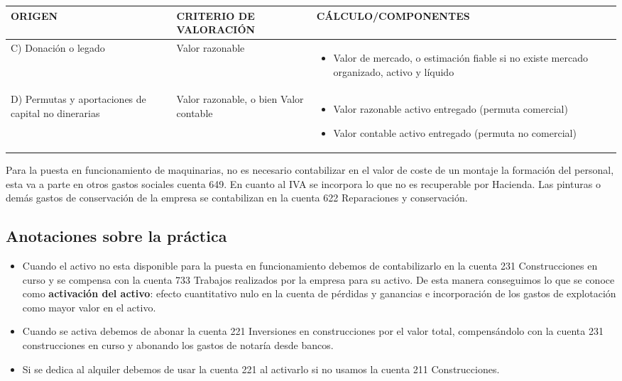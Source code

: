 \documentclass[a4paper,12pt]{article}
\begin{document}
\begin{table}[H]
\centering
\begin{tabular}{|p{4cm}|p{4cm}|p{6cm}|}
\hline
\textbf{ORIGEN} & \textbf{CRITERIO DE VALORACIÓN} & \textbf{CÁLCULO/COMPONENTES} \\
\hline
C) Donación o legado & Valor razonable & 
\begin{itemize}
    \item Valor de mercado, o estimación fiable si no existe mercado organizado, activo y líquido
\end{itemize} \\
\hline
D) Permutas y aportaciones de capital no dinerarias & Valor razonable, o bien Valor contable & 
\begin{itemize}
    \item Valor razonable activo entregado (permuta comercial)
    \item Valor contable activo entregado (permuta no comercial)
\end{itemize} \\
\hline
\end{tabular}
\end{table}

\begin{tcolorbox}[colback=yellow!20!white, colframe=yellow!80!black, title=Nota]
    Para la puesta en funcionamiento de maquinarias, no es necesario contabilizar en el valor de coste de un montaje la formación del personal, esta va a parte en otros gastos sociales cuenta 649. En cuanto al IVA se incorpora lo que no es recuperable por Hacienda. Las pinturas o demás gastos de conservación de la empresa se contabilizan en la cuenta 622 Reparaciones y conservación.
\end{tcolorbox}

\subsection*{Anotaciones sobre la práctica}
\begin{itemize}
    \item Cuando el activo no esta disponible para la puesta en funcionamiento debemos de contabilizarlo en la cuenta 231 Construcciones en curso y se compensa con la cuenta 733 Trabajos realizados por la empresa para su activo. De esta manera conseguimos lo que se conoce como \textbf{activación del activo}: efecto cuantitativo nulo en la cuenta de pérdidas y ganancias e incorporación de los gastos de explotación como mayor valor en el activo.
    \item Cuando se activa debemos de abonar la cuenta 221 Inversiones en construcciones por el valor total, compensándolo con la cuenta 231 construcciones en curso y abonando los gastos de notaría desde bancos.
    \item Si se dedica al alquiler debemos de usar la cuenta 221 al activarlo si no usamos la cuenta 211 Construcciones.
\end{itemize}
\end{document}
